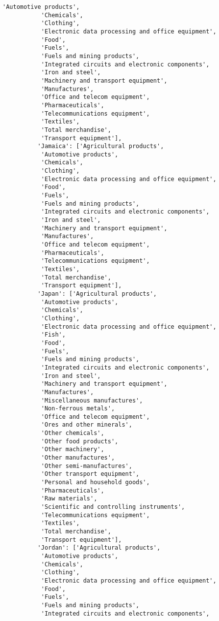 \documentclass[11pt]{article}
\begin{document}
\begin{Verbatim}[commandchars=\\\{\}]
           'Automotive products',
           'Chemicals',
           'Clothing',
           'Electronic data processing and office equipment',
           'Food',
           'Fuels',
           'Fuels and mining products',
           'Integrated circuits and electronic components',
           'Iron and steel',
           'Machinery and transport equipment',
           'Manufactures',
           'Office and telecom equipment',
           'Pharmaceuticals',
           'Telecommunications equipment',
           'Textiles',
           'Total merchandise',
           'Transport equipment'],
          'Jamaica': ['Agricultural products',
           'Automotive products',
           'Chemicals',
           'Clothing',
           'Electronic data processing and office equipment',
           'Food',
           'Fuels',
           'Fuels and mining products',
           'Integrated circuits and electronic components',
           'Iron and steel',
           'Machinery and transport equipment',
           'Manufactures',
           'Office and telecom equipment',
           'Pharmaceuticals',
           'Telecommunications equipment',
           'Textiles',
           'Total merchandise',
           'Transport equipment'],
          'Japan': ['Agricultural products',
           'Automotive products',
           'Chemicals',
           'Clothing',
           'Electronic data processing and office equipment',
           'Fish',
           'Food',
           'Fuels',
           'Fuels and mining products',
           'Integrated circuits and electronic components',
           'Iron and steel',
           'Machinery and transport equipment',
           'Manufactures',
           'Miscellaneous manufactures',
           'Non-ferrous metals',
           'Office and telecom equipment',
           'Ores and other minerals',
           'Other chemicals',
           'Other food products',
           'Other machinery',
           'Other manufactures',
           'Other semi-manufactures',
           'Other transport equipment',
           'Personal and household goods',
           'Pharmaceuticals',
           'Raw materials',
           'Scientific and controlling instruments',
           'Telecommunications equipment',
           'Textiles',
           'Total merchandise',
           'Transport equipment'],
          'Jordan': ['Agricultural products',
           'Automotive products',
           'Chemicals',
           'Clothing',
           'Electronic data processing and office equipment',
           'Food',
           'Fuels',
           'Fuels and mining products',
           'Integrated circuits and electronic components',

\end{Verbatim}
\end{document}
